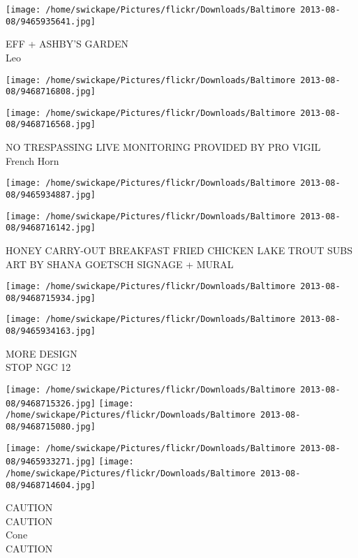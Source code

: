 \documentclass[10pt,letterpaper]{article}
\begin{document}
\vspace{0.25in}
\texttt{[image: /home/swickape/Pictures/flickr/Downloads/Baltimore 2013-08-08/9465935641.jpg]}

EFF + ASHBY'S GARDEN\\
Leo
\pagebreak

\texttt{[image: /home/swickape/Pictures/flickr/Downloads/Baltimore 2013-08-08/9468716808.jpg]}

\vspace{0.25in}
\texttt{[image: /home/swickape/Pictures/flickr/Downloads/Baltimore 2013-08-08/9468716568.jpg]}

NO TRESPASSING LIVE MONITORING PROVIDED BY PRO VIGIL\\
French Horn
\pagebreak

\texttt{[image: /home/swickape/Pictures/flickr/Downloads/Baltimore 2013-08-08/9465934887.jpg]}

\vspace{0.25in}
\texttt{[image: /home/swickape/Pictures/flickr/Downloads/Baltimore 2013-08-08/9468716142.jpg]}

HONEY CARRY{-}OUT BREAKFAST FRIED CHICKEN LAKE TROUT SUBS\\
ART BY SHANA GOETSCH SIGNAGE + MURAL
\pagebreak

\texttt{[image: /home/swickape/Pictures/flickr/Downloads/Baltimore 2013-08-08/9468715934.jpg]}

\vspace{0.25in}
\texttt{[image: /home/swickape/Pictures/flickr/Downloads/Baltimore 2013-08-08/9465934163.jpg]}

MORE DESIGN\\
STOP NGC 12
\pagebreak

\texttt{[image: /home/swickape/Pictures/flickr/Downloads/Baltimore 2013-08-08/9468715326.jpg]}
\texttt{[image: /home/swickape/Pictures/flickr/Downloads/Baltimore 2013-08-08/9468715080.jpg]}

\texttt{[image: /home/swickape/Pictures/flickr/Downloads/Baltimore 2013-08-08/9465933271.jpg]}
\texttt{[image: /home/swickape/Pictures/flickr/Downloads/Baltimore 2013-08-08/9468714604.jpg]}

CAUTION\\
CAUTION\\
Cone\\
CAUTION
\pagebreak
\end{document}
